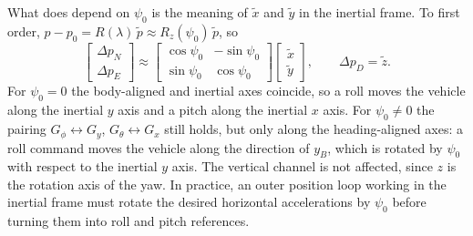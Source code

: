 What does depend on $\psi_0$ is the meaning of $\tilde x$ and $\tilde y$ in the inertial frame.
To first order, $p - p_0 = R(\lambda)\,\tilde p \approx R_z(\psi_0)\,\tilde p$, so
\begin{equation*}
\begin{bmatrix} \Delta p_N \\ \Delta p_E \end{bmatrix} \approx
\begin{bmatrix} \cos\psi_0 & -\sin\psi_0 \\ \sin\psi_0 & \cos\psi_0 \end{bmatrix}
\begin{bmatrix} \tilde x \\ \tilde y \end{bmatrix},
\qquad \Delta p_D = \tilde z .
\end{equation*}
For $\psi_0 = 0$ the body-aligned and inertial axes coincide, so a roll moves the vehicle along the inertial $y$ axis and a pitch along the inertial $x$ axis.
For $\psi_0 \neq 0$ the pairing $G_\phi \leftrightarrow G_y$, $G_\theta \leftrightarrow G_x$ still holds, but only along the heading-aligned axes: a roll command moves the vehicle along the direction of $y_B$, which is rotated by $\psi_0$ with respect to the inertial $y$ axis.
The vertical channel is not affected, since $z$ is the rotation axis of the yaw.
In practice, an outer position loop working in the inertial frame must rotate the desired horizontal accelerations by $\psi_0$ before turning them into roll and pitch references.
